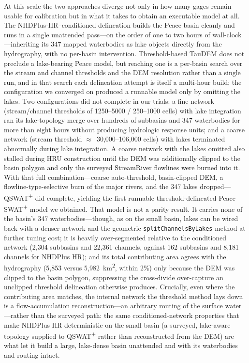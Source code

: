 At this scale the two approaches diverge not only in how many gages remain usable for calibration but in what it takes to obtain an executable model at all.
The NHDPlus-HR--conditioned delineation builds the Peace basin cleanly and runs in a single unattended pass---on the order of one to two hours of wall-clock---inheriting its 347 mapped waterbodies as lake objects directly from the hydrography, with no per-basin intervention.
Threshold-based TauDEM does not preclude a lake-bearing Peace model, but reaching one is a per-basin search over the stream and channel thresholds and the DEM resolution rather than a single run, and in that search each delineation attempt is itself a multi-hour build; the configuration we converged on produced a runnable model only by omitting the lakes.
Two configurations did not complete in our trials: a fine network (stream/channel thresholds of 1250--5000 / 250--1000 cells) with lake integration ran its lake-topology merge over hundreds of subbasins and 347 waterbodies for more than eight hours without producing hydrologic response units; and a coarse network (stream threshold $\approx$~30{,}000--106{,}000 cells) with lakes terminated abnormally during lake integration.
A coarse network with the lakes omitted also stalled during HRU construction until the DEM was additionally clipped to the basin polygon and only the surveyed StreamRiver flowlines were burned into it.
With that full combination---coarse auto-threshold, basin-clipped DEM, a flowline-type-selective burn of the major rivers, and the 347 lakes dropped---QSWAT\textsuperscript{+} did complete, yielding the first runnable threshold-delineated Peace SWAT\textsuperscript{+} model we obtained.
That model is not a parity result. It carries none of the basin's 347 waterbodies---though, as on the small basin, lakes can be wired back with a denser network and the geometric \texttt{splitChannelsByLakes} method at further tuning cost; it is heavily over-segmented relative to the conditioned network (2{,}304 subbasins and 22{,}361 channels, against 162 subbasins and 8{,}181 channels for NHDPlus HR); and its total contributing area agrees with the hydrography (5{,}853 versus 5{,}982~km\textsuperscript{2}, within 2\%) only because the DEM was clipped to the basin polygon, suppressing the cross-divide over-capture an unclipped threshold delineation otherwise produces.
Crucially, even where the contributing area matches, the internal network the threshold method lays down is a flow-accumulation reconstruction---an arbitrary routing of the surface water---rather than the surveyed path: the same conditioned-network properties that make NHDPlus HR deterministic on the small basin (a surveyed, lake-aware topology supplied to QSWAT\textsuperscript{+} rather than reconstructed from the DEM) are what let it build a large, lake-dense basin unattended and with its waterbodies and routing intact.

